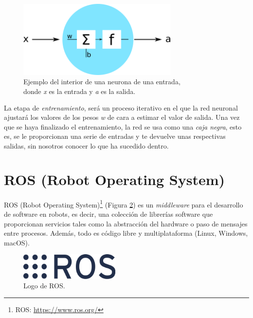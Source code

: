 \begin{figure} [h!]
  \begin{center}
    \includegraphics[width=8cm]{figs/neurona.png}
  \end{center}
  \captionsetup{justification=centering}
  \caption{Ejemplo del interior de una neurona de una entrada,\\
  donde \textit{x} es la entrada y \textit{a} es la salida.}
  \label{fig:neurona}
\end{figure}

La etapa de \textit{entrenamiento}, será un proceso iterativo en el que la red neuronal ajustará los valores de los pesos \textit{w} de cara a estimar el valor de salida.  Una vez que se haya finalizado el entrenamiento, la red se usa como una \textit{caja negra}, esto es, se le proporcionan una serie de entradas y te devuelve unas respectivas salidas, sin nosotros conocer lo que ha sucedido dentro.

\section{ROS (Robot Operating System)}

ROS (Robot Operating System)\footnote{ROS: \url{https://www.ros.org/}} (Figura \ref{fig:logo_ros}) es un \textit{middleware} para el desarrollo de software en robots, es decir, una colección de librerías software que proporcionan servicios tales como la abstracción del hardware o paso de mensajes entre procesos. Además, todo es código libre y multiplataforma (Linux, Windows, macOS).\\

\begin{figure} [h!]
  \begin{center}
    \includegraphics[width=5cm]{figs/ros_logo.png}
  \end{center}
  \captionsetup{justification=centering}
  \caption{Logo de ROS.}
  \label{fig:logo_ros}
\end{figure}

